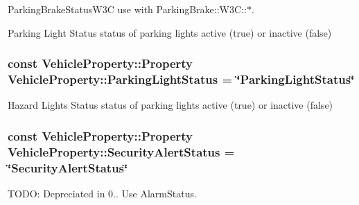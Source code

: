 Parking\+Brake\+Status\+W3\+C use with Parking\+Brake\+::\+W3\+C\+:\+:$\ast$. 

Parking Light Status status of parking lights active (true) or inactive (false) \hypertarget{classVehicleProperty_a505ffc37974f674df55a97c27a7ba0b7}{
\subsubsection[{Parking\+Light\+Status}]{\setlength{\rightskip}{0pt plus 5cm}const Vehicle\+Property\+::\+Property Vehicle\+Property\+::\+Parking\+Light\+Status = \char`\"{}Parking\+Light\+Status\char`\"{}\hspace{0.3cm}{\ttfamily [static]}}}\label{classVehicleProperty_a505ffc37974f674df55a97c27a7ba0b7}
Hazard Lights Status status of parking lights active (true) or inactive (false) \hypertarget{classVehicleProperty_a7bc28af663879a2ac9145e5b97a5da4f}{
\subsubsection[{Security\+Alert\+Status}]{\setlength{\rightskip}{0pt plus 5cm}const Vehicle\+Property\+::\+Property Vehicle\+Property\+::\+Security\+Alert\+Status = \char`\"{}Security\+Alert\+Status\char`\"{}\hspace{0.3cm}{\ttfamily [static]}}}\label{classVehicleProperty_a7bc28af663879a2ac9145e5b97a5da4f}


T\+O\+D\+O\+: Depreciated in 0.. Use Alarm\+Status. 

